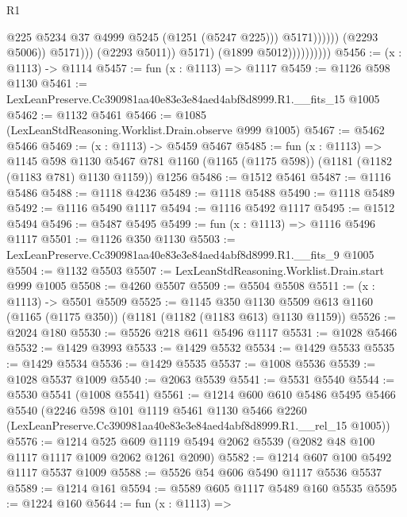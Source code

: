 \begin{lexlean}{R1}
\begin{coremodule}
                                                @225
                                                @5234
                                                @37
                                                @4999
                                                @5245
                                                (@1251 (@5247 @225)))
                                              @5171))))))
                                  (@2293 @5006))
                                @5171)))
                          (@2293 @5011))
                        @5171)
                      (@1899 @5012))))))))))
@5456 := (x : @1113) -> @1114
@5457 := fun (x : @1113) => @1117
@5459 := @1126 @598 @1130
@5461 := LexLeanPreserve.Cc390981aa40e83e3e84aed4abf8d8999.R1.__fits_15 @1005
@5462 := @1132 @5461
@5466 := @1085 (LexLeanStdReasoning.Worklist.Drain.observe @999 @1005)
@5467 := @5462 @5466
@5469 := (x : @1113) -> @5459 @5467
@5485 := fun (x : @1113) =>
  @1145
    @598
    @1130
    @5467
    @781
    @1160
    (@1165 (@1175 @598))
    (@1181 (@1182 (@1183 @781) @1130 @1159))
    @1256
@5486 := @1512 @5461
@5487 := @1116 @5486
@5488 := @1118 @4236
@5489 := @1118 @5488
@5490 := @1118 @5489
@5492 := @1116 @5490 @1117
@5494 := @1116 @5492 @1117
@5495 := @1512 @5494
@5496 := @5487 @5495
@5499 := fun (x : @1113) => @1116 @5496 @1117
@5501 := @1126 @350 @1130
@5503 := LexLeanPreserve.Cc390981aa40e83e3e84aed4abf8d8999.R1.__fits_9 @1005
@5504 := @1132 @5503
@5507 := LexLeanStdReasoning.Worklist.Drain.start @999 @1005
@5508 := @4260 @5507
@5509 := @5504 @5508
@5511 := (x : @1113) -> @5501 @5509
@5525 := @1145
    @350
    @1130
    @5509
    @613
    @1160
    (@1165 (@1175 @350))
    (@1181 (@1182 (@1183 @613) @1130 @1159))
@5526 := @2024 @180
@5530 := @5526 @218 @611 @5496 @1117
@5531 := @1028 @5466
@5532 := @1429 @3993
@5533 := @1429 @5532
@5534 := @1429 @5533
@5535 := @1429 @5534
@5536 := @1429 @5535
@5537 := @1008 @5536
@5539 := @1028 @5537 @1009
@5540 := @2063 @5539
@5541 := @5531 @5540
@5544 := @5530 @5541 (@1008 @5541)
@5561 := @1214
    @600
    @610
    @5486
    @5495
    @5466
    @5540
    (@2246
      @598
      @101
      @1119
      @5461
      @1130
      @5466
      @2260
      (LexLeanPreserve.Cc390981aa40e83e3e84aed4abf8d8999.R1.__rel_15 @1005))
@5576 := @1214
    @525
    @609
    @1119
    @5494
    @2062
    @5539
    (@2082 @48 @100 @1117 @1117 @1009 @2062 @1261 @2090)
@5582 := @1214 @607 @100 @5492 @1117 @5537 @1009
@5588 := @5526 @54 @606 @5490 @1117 @5536 @5537
@5589 := @1214 @161
@5594 := @5589 @605 @1117 @5489 @160 @5535
@5595 := @1224 @160
@5644 := fun (x : @1113) =>

\end{coremodule}
\end{lexlean}
